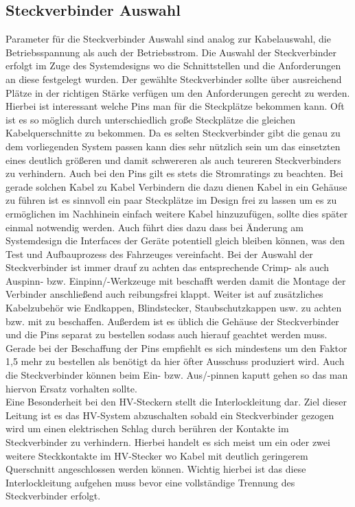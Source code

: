 \FloatBarrier
\subsection{Steckverbinder Auswahl}
Parameter für die Steckverbinder Auswahl sind analog zur Kabelauswahl, die Betriebsspannung als auch der Betriebsstrom. Die Auswahl der Steckverbinder erfolgt im Zuge des Systemdesigns wo die Schnittstellen und die Anforderungen an diese festgelegt wurden. Der gewählte Steckverbinder sollte über ausreichend Plätze in der richtigen Stärke verfügen um den Anforderungen gerecht zu werden. Hierbei ist interessant welche Pins man für die Steckplätze bekommen kann. Oft ist es so möglich durch unterschiedlich große Steckplätze die gleichen Kabelquerschnitte zu bekommen. Da es selten Steckverbinder gibt die genau zu dem vorliegenden System passen kann dies sehr nützlich sein um das einsetzten eines deutlich größeren und damit schwereren als auch teureren Steckverbinders zu verhindern. Auch bei den Pins gilt es stets die Stromratings zu beachten. Bei gerade solchen Kabel zu Kabel Verbindern die dazu dienen Kabel in ein Gehäuse zu führen ist es sinnvoll ein paar Steckplätze im Design frei zu lassen um es zu ermöglichen im Nachhinein einfach weitere Kabel hinzuzufügen, sollte dies später einmal notwendig werden. Auch führt dies dazu dass bei Änderung am Systemdesign die Interfaces der Geräte potentiell gleich bleiben können, was den Test und Aufbauprozess des Fahrzeuges vereinfacht. 
Bei der Auswahl der Steckverbinder ist immer drauf zu achten das entsprechende Crimp- als auch Auspinn- bzw. Einpinn/-Werkzeuge mit beschafft werden damit die Montage der Verbinder anschließend auch reibungsfrei klappt. Weiter ist auf zusätzliches Kabelzubehör wie Endkappen, Blindstecker, Staubschutzkappen usw. zu achten bzw. mit zu beschaffen. Außerdem ist es üblich die Gehäuse der Steckverbinder und die Pins separat zu bestellen sodass auch hierauf geachtet werden muss. Gerade bei der Beschaffung der Pins empfiehlt es sich mindestens um den Faktor 1,5 mehr zu bestellen als benötigt da hier öfter Ausschuss produziert wird. Auch die Steckverbinder können beim Ein- bzw. Aus/-pinnen kaputt gehen so das man hiervon Ersatz vorhalten sollte.\\
Eine Besonderheit bei den \ac{HV}-Steckern stellt die Interlockleitung dar. Ziel dieser Leitung ist es das \ac{HV}-System abzuschalten sobald ein Steckverbinder gezogen wird um einen elektrischen Schlag durch berühren der Kontakte im Steckverbinder zu verhindern. Hierbei handelt es sich meist um ein oder zwei weitere Steckkontakte im \ac{HV}-Stecker wo Kabel mit deutlich geringerem Querschnitt angeschlossen werden können. Wichtig hierbei ist das diese Interlockleitung aufgehen muss bevor eine vollständige Trennung des Steckverbinder erfolgt. 

